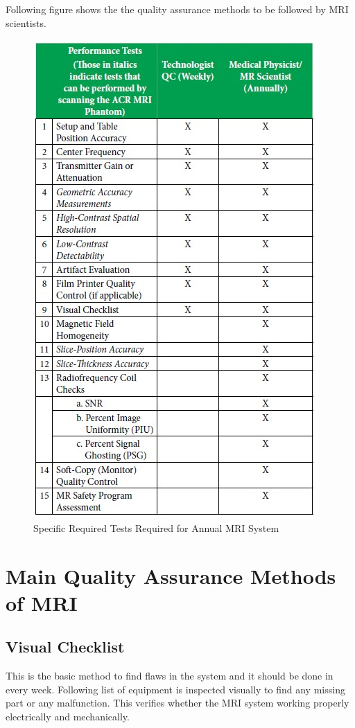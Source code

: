 \documentclass[12pt]{article}
\begin{document}
Following figure shows the the quality assurance methods to be followed by MRI scientists.  
\begin{figure}[h!]
    \centering
    \includegraphics[width=0.75\linewidth]{ls.jpg}
    \caption{\small{Specific Required Tests Required for Annual MRI System}}
    \label{fig:Specific Required Tests Required for Annual MRI System}
\end{figure}
\pagebreak
\section{Main Quality Assurance Methods of MRI}
\subsection{Visual Checklist}
This is the basic method to find flaws in the system and it should be done in every week. Following list of equipment is inspected visually to find any missing part or any malfunction. This verifies whether the MRI system working properly electrically and mechanically. 
\end{document}
